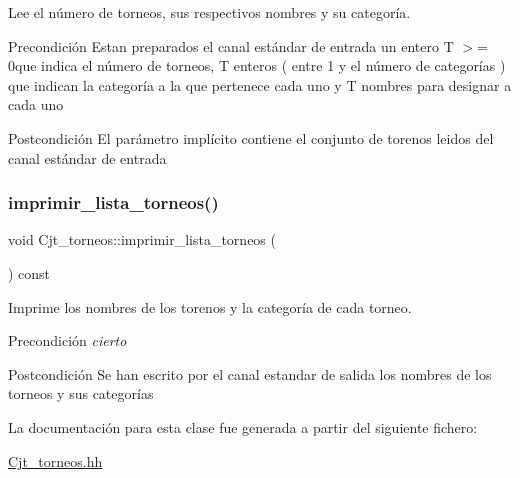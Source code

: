 Lee el número de torneos, sus respectivos nombres y su categoría. 

\begin{DoxyPrecond}{Precondición}
Estan preparados el canal estándar de entrada un entero T $>$= 0que indica el número de torneos, T enteros ( entre 1 y el número de categorías ) que indican la categoría a la que pertenece cada uno y T nombres para designar a cada uno 
\end{DoxyPrecond}
\begin{DoxyPostcond}{Postcondición}
El parámetro implícito contiene el conjunto de torenos leidos del canal estándar de entrada 
\end{DoxyPostcond}
\mbox{\label{class_cjt__torneos_aeaa059c6509b254de82f218f09ff9e3e}} 
\subsubsection{\texorpdfstring{imprimir\+\_\+lista\+\_\+torneos()}{imprimir\_lista\_torneos()}}
{\footnotesize\ttfamily void Cjt\+\_\+torneos\+::imprimir\+\_\+lista\+\_\+torneos (\begin{DoxyParamCaption}{ }\end{DoxyParamCaption}) const}



Imprime los nombres de los torenos y la categoría de cada torneo. 

\begin{DoxyPrecond}{Precondición}
{\itshape cierto} 
\end{DoxyPrecond}
\begin{DoxyPostcond}{Postcondición}
Se han escrito por el canal estandar de salida los nombres de los torneos y sus categorías 
\end{DoxyPostcond}


La documentación para esta clase fue generada a partir del siguiente fichero\+:\begin{DoxyCompactItemize}
\item 
\hyperlink{_cjt__torneos_8hh}{Cjt\+\_\+torneos.\+hh}\end{DoxyCompactItemize}
